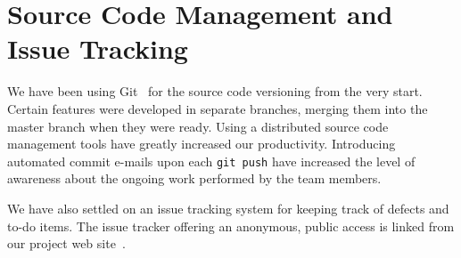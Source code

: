 \documentclass[deska]{subfiles}
\begin{document}
\section{Source Code Management and Issue Tracking}

We have been using Git~\cite{git} for the source code versioning from the very start.  Certain features were developed
in separate branches, merging them into the master branch when they were ready.  Using a distributed source code
management tools have greatly increased our productivity.  Introducing automated commit e-mails upon each {\tt git push}
have increased the level of awareness about the ongoing work performed by the team members.

We have also settled on an issue tracking system for keeping track of defects and to-do items.  The issue tracker
offering an anonymous, public access is linked from our project web site~\cite{deska-project}.
\end{document}
